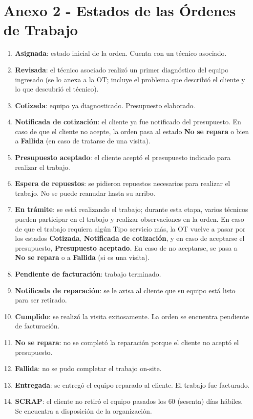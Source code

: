 \documentclass[12pt]{extarticle}
\begin{document}
\clearpage

\section{Anexo 2 - Estados de las Órdenes de Trabajo}

    \begin{enumerate}
        \item \textbf{Asignada}: estado inicial de la orden. Cuenta con un técnico asociado.
        \item \textbf{Revisada}: el técnico asociado realizó un primer diagnóstico del equipo ingresado (se lo anexa a la OT; incluye el problema que describió el cliente y lo que descubrió el técnico).
        \item \textbf{Cotizada}: equipo ya diagnosticado. Presupuesto elaborado.
        \item \textbf{Notificada de cotización}: el cliente ya fue notificado del presupuesto. En caso de que el cliente no acepte, la orden pasa al estado \textbf{No se repara} o bien a \textbf{Fallida} (en caso de tratarse de una visita). 
        \item \textbf{Presupuesto aceptado}: el cliente aceptó el presupuesto indicado para realizar el trabajo.
        \item \textbf{Espera de repuestos}: se pidieron repuestos necesarios para realizar el trabajo. No se puede reanudar hasta su arribo.
        \item \textbf{En trámite}: se está realizando el trabajo; durante esta etapa, varios técnicos pueden participar en el trabajo y realizar observaciones en la orden. En caso de que el trabajo requiera algún Tipo servicio más, la OT vuelve a pasar por los estados \textbf{Cotizada}, \textbf{Notificada de cotización}, y en caso de aceptarse el presupuesto, \textbf{Presupuesto aceptado}. En caso de no aceptarse, se pasa a \textbf{No se repara} o a \textbf{Fallida} (si es una visita).
        \item \textbf{Pendiente de facturación}: trabajo terminado. 
        \item \textbf{Notificada de reparación}: se le avisa al cliente que su equipo está listo para ser retirado.
        \item \textbf{Cumplido}: se realizó la visita exitosamente. La orden se encuentra pendiente de facturación.
        \item \textbf{No se repara}: no se completó la reparación porque el cliente no aceptó el presupuesto.
        \item \textbf{Fallida}: no se pudo completar el trabajo on-site.
        \item \textbf{Entregada}: se entregó el equipo reparado al cliente. El trabajo fue facturado.
        \item \textbf{SCRAP}: el cliente no retiró el equipo pasados los 60 (sesenta) días hábiles. Se encuentra a disposición de la organización.
    \end{enumerate}
\end{document}

